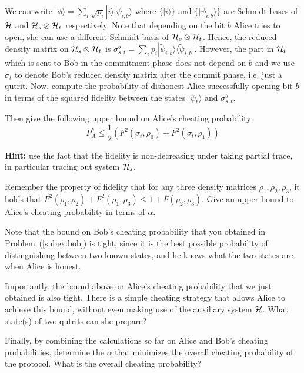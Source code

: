 \documentclass[a4paper,10pt,landscape,twocolumn]{scrartcl}
\newcommand{\ket}[1]{| #1 \rangle}
\newcommand{\bra}[1]{\langle #1 |}
\begin{document}
\begin{exercise}
\begin{subex}
We can write $\ket{\phi} = \sum_i \sqrt{p_i} \ket{i} \ket{\tilde{\psi}_{i,b}}$ where $\{\ket{i}\}$ and $\{ \ket{\tilde{\psi}_{i,b}} \}$ are Schmidt bases of $\mathcal{H}$ and $\mathcal{H}_s \otimes \mathcal{H}_t$ respectively. Note that depending on the bit $b$ Alice tries to open, she can use a different Schmidt basis of $\mathcal{H}_s \otimes \mathcal{H}_t$. Hence, the reduced density matrix on $\mathcal{H}_s \otimes \mathcal{H}_t$ is $\sigma^b_{s,t} = \sum_i p_i \ket{\tilde{\psi}_{i,b}}\bra{\tilde{\psi}_{i,b}}$. However, the part in $\mathcal{H}_t$ which is sent to Bob in the commitment phase does not depend on $b$ and we use $\sigma_t$ to denote Bob's reduced density matrix after the commit phase, i.e. just a qutrit.
Now, compute the probability of dishonest Alice successfully opening bit $b$ in terms of the squared fidelity between the states $\ket{\psi_b}$ and $\sigma^b_{s,t}$.
\end{subex}

\begin{subex}
Then give the following upper bound on Alice's cheating probability:
\[
P_A^* \leq \frac12 \left( F^2(\sigma_t, \rho_0) + F^2(\sigma_t,\rho_1) \right)
\]

\textbf{Hint: } use the fact that the fidelity is non-decreasing under taking partial trace, in particular tracing out system $\mathcal{H}_s$.

\end{subex}

\begin{subex}
Remember the property of fidelity that for any three density matrices $\rho_1, \rho_2, \rho_3$, it holds that $F^2(\rho_1, \rho_2) + F^2(\rho_1, \rho_3) \leq 1 + F(\rho_2, \rho_3)$. Give an upper bound to Alice's cheating probability in terms of $\alpha$.
\end{subex}

\begin{subex}
Note that the bound on Bob's cheating probability that you obtained in Problem~(\ref{subex:bob}) is tight, since it is the best possible probability of distinguishing between two known states, and he knows what the two states are when Alice is honest. 

Importantly, the bound above on Alice's cheating probability that we just obtained is also tight. There is a simple cheating strategy that allows Alice to achieve this bound, without even making use of the auxiliary system $\mathcal{H}$. What state(s) of two qutrits can she prepare?
\end{subex}

\begin{subex}
Finally, by combining the calculations so far on Alice and Bob's cheating probabilities, determine the $\alpha$ that minimizes the overall cheating probability of the protocol. What is the overall cheating probability?
\end{subex}

\end{exercise}
\end{document}

